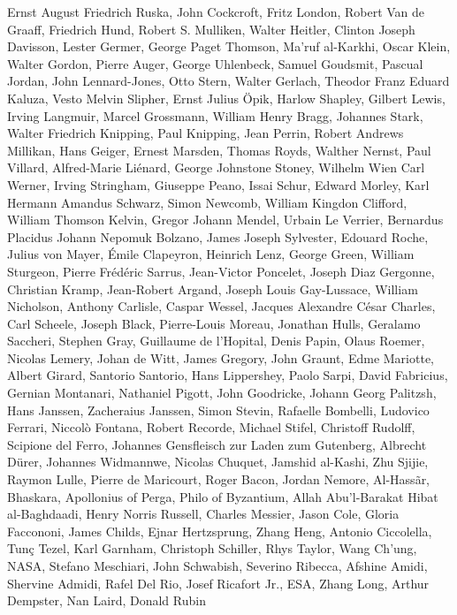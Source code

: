 \begin{spacing}{0.5}
\begin{tiny}
Ernst August Friedrich Ruska, John Cockcroft, Fritz London, Robert Van de Graaff, Friedrich Hund, Robert S. Mulliken, Walter Heitler, Clinton Joseph Davisson, Lester Germer, George Paget Thomson, Ma'ruf al-Karkhi, Oscar Klein, Walter Gordon, Pierre Auger, George Uhlenbeck, Samuel Goudsmit, Pascual Jordan, John Lennard-Jones, Otto Stern, Walter Gerlach, Theodor Franz Eduard Kaluza, Vesto Melvin Slipher, Ernst Julius Öpik, Harlow Shapley, Gilbert Lewis, Irving Langmuir, Marcel Grossmann, William Henry Bragg, Johannes Stark, Walter Friedrich Knipping, Paul Knipping, Jean Perrin, Robert Andrews Millikan, Hans Geiger, Ernest Marsden, Thomas Royds, Walther Nernst, Paul Villard, Alfred-Marie Liénard, George Johnstone Stoney, Wilhelm Wien Carl Werner, Irving Stringham, Giuseppe Peano, Issai Schur, Edward Morley, Karl Hermann Amandus Schwarz, Simon Newcomb, William Kingdon Clifford, William Thomson Kelvin, Gregor Johann Mendel, Urbain Le Verrier, Bernardus Placidus Johann Nepomuk Bolzano, James Joseph Sylvester, Edouard Roche, Julius von Mayer, Émile Clapeyron, Heinrich Lenz, George Green, William Sturgeon, Pierre Frédéric Sarrus, Jean-Victor Poncelet, Joseph Diaz Gergonne, Christian Kramp, Jean-Robert Argand, Joseph Louis Gay-Lussace, William Nicholson, Anthony Carlisle, Caspar Wessel, Jacques Alexandre César Charles, Carl Scheele, Joseph Black, Pierre-Louis Moreau, Jonathan Hulls, Geralamo Saccheri, Stephen Gray, Guillaume de l'Hopital, Denis Papin, Olaus Roemer, Nicolas Lemery, Johan de Witt, James Gregory, John Graunt, Edme Mariotte, Albert Girard, Santorio Santorio, Hans Lippershey, Paolo Sarpi, David Fabricius, Gernian Montanari, Nathaniel Pigott, John Goodricke, Johann Georg Palitzsh, Hans Janssen, Zacheraius Janssen, Simon Stevin, Rafaelle Bombelli, Ludovico Ferrari, Niccolò Fontana, Robert Recorde, Michael Stifel, Christoff Rudolff, Scipione del Ferro, Johannes Gensfleisch zur Laden zum Gutenberg, Albrecht Dürer, Johannes Widmannwe, Nicolas Chuquet, Jamshid al-Kashi, Zhu Sjijie, Raymon Lulle, Pierre de Maricourt, Roger Bacon, Jordan Nemore, Al-Hassãr, Bhaskara, Apollonius of Perga, Philo of Byzantium, Allah Abu'l-Barakat Hibat al-Baghdaadi, Henry Norris Russell, Charles Messier, Jason Cole, Gloria Faccononi, James Childs, Ejnar Hertzsprung, Zhang Heng, Antonio Ciccolella, Tunç Tezel, Karl Garnham, Christoph Schiller, Rhys Taylor, Wang Ch'ung, NASA, Stefano Meschiari, John Schwabish, Severino Ribecca, Afshine Amidi, Shervine Admidi, Rafel Del Rio, Josef Ricafort Jr., ESA, Zhang Long, Arthur Dempster, Nan Laird, Donald Rubin
	\end{tiny}
	\end{spacing}


